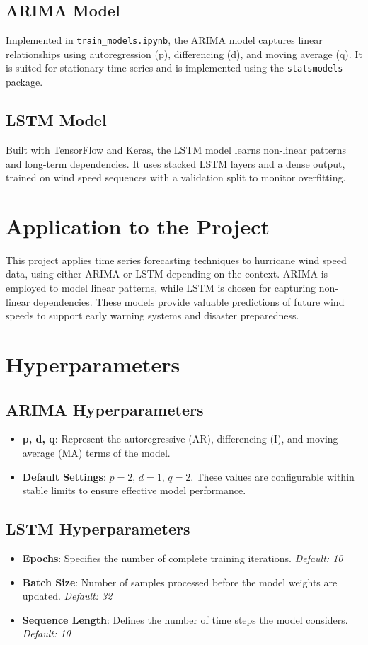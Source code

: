 \subsection{ARIMA Model}
Implemented in \texttt{train\_models.ipynb}, the ARIMA model captures linear relationships using autoregression (p), differencing (d), and moving average (q). It is suited for stationary time series and is implemented using the \texttt{statsmodels} package.

\subsection{LSTM Model}
Built with TensorFlow and Keras, the LSTM model learns non-linear patterns and long-term dependencies. It uses stacked LSTM layers and a dense output, trained on wind speed sequences with a validation split to monitor overfitting.

\section{Application to the Project}

This project applies time series forecasting techniques to hurricane wind speed data, using either ARIMA or LSTM depending on the context. ARIMA is employed to model linear patterns, while LSTM is chosen for capturing non-linear dependencies. These models provide valuable predictions of future wind speeds to support early warning systems and disaster preparedness.

\section{Hyperparameters}

\subsection{ARIMA Hyperparameters}
\begin{itemize}
	\item \textbf{p, d, q}: Represent the autoregressive (AR), differencing (I), and moving average (MA) terms of the model.
	\item \textbf{Default Settings}: \(p = 2\), \(d = 1\), \(q = 2\). These values are configurable within stable limits to ensure effective model performance.
\end{itemize}

\subsection{LSTM Hyperparameters}
\begin{itemize}
	\item \textbf{Epochs}: Specifies the number of complete training iterations. \textit{Default: 10}
	\item \textbf{Batch Size}: Number of samples processed before the model weights are updated. \textit{Default: 32}
	\item \textbf{Sequence Length}: Defines the number of time steps the model considers. \textit{Default: 10}
\end{itemize}

